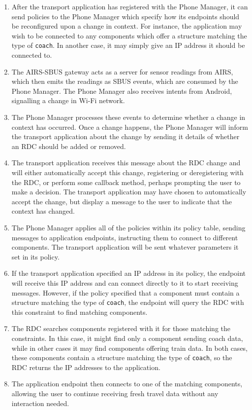 \documentclass[12pt,twoside,notitlepage]{report}
\begin{document}
\begin{enumerate}

\item After the transport application has registered with the Phone Manager, it can send policies to the Phone Manager which specify how its endpoints should be reconfigured upon a change in context. For instance, the application may wish to be connected to any components which offer a structure matching the type of {\tt coach}. In another case, it may simply give an IP address it should be connected to.

\item The AIRS-SBUS gateway acts as a server for sensor readings from AIRS, which then emits the readings as SBUS events, which are consumed by the Phone Manager. The Phone Manager also receives intents from Android, signalling a change in Wi-Fi network.

\item The Phone Manager processes these events to determine whether a change in context has occurred. Once a change happens, the Phone Manager will inform the transport application about the change by sending it details of whether an RDC should be added or removed. 

\item The transport application receives this message about the RDC change and will either automatically accept this change, registering or deregistering with the RDC, or perform some callback method, perhaps prompting the user to make a decision. The transport application may have chosen to automatically accept the change, but display a message to the user to indicate that the context has changed.

\item The Phone Manager applies all of the policies within its policy table, sending messages to application endpoints, instructing them to connect to different components. The transport application will be sent whatever parameters it set in its policy.

\item If the transport application specified an IP address in its policy, the endpoint will receive this IP address and can connect directly to it to start receiving messages. However, if the policy specified that a component must contain a structure matching the type of {\tt coach}, the endpoint will query the RDC with this constraint to find matching components.

\item The RDC searches components registered with it for those matching the constraints. In this case, it might find only a component sending coach data, while in other cases it may find components offering train data. In both cases, these components contain a structure matching the type of {\tt coach}, so the RDC returns the IP addresses to the application.

\item The application endpoint then connects to one of the matching components, allowing the user to continue receiving fresh travel data without any interaction needed.

\end{enumerate}
\end{document}

